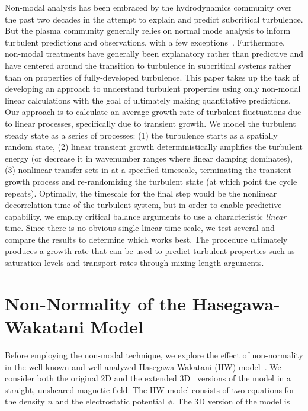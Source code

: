 \documentclass[letter,scriptaddress,twocolumn, prl,showkeys]{revtex4}
\begin{document}
Non-modal analysis has been embraced by the hydrodynamics community over the past two decades in the attempt to explain and predict subcritical turbulence. But the plasma community
generally relies on normal mode analysis to inform turbulent predictions and observations, with a few exceptions~\cite{camargo1998,camporeale2010,schekochihin2012}. 
Furthermore, non-modal treatments have generally been explanatory rather than predictive and have centered around the transition to turbulence in subcritical systems rather 
than on properties of fully-developed turbulence.
This paper takes up the task of developing an approach to understand turbulent properties using only non-modal linear calculations with the goal of 
ultimately making quantitative predictions.  Our approach is to calculate an average growth rate of turbulent fluctuations due to linear processes, specifically due to transient growth.  We model the
turbulent steady state as a series of processes:  (1) the turbulence starts as a spatially random state, (2) linear transient growth deterministically amplifies the turbulent energy (or
decrease it in wavenumber ranges where linear damping dominates), (3) nonlinear transfer sets in at a specified timescale, terminating the
transient growth process and re-randomizing the turbulent state (at which point the cycle repeats).    Optimally, the timescale for the final step would be the
nonlinear decorrelation time of the turbulent system, but in order to enable predictive capability, we employ critical balance
arguments to use a characteristic \emph{linear} time. Since there is no obvious single linear time scale, we test several and compare the results to determine which works best.
The procedure ultimately produces a growth rate that can be used
to predict turbulent properties such as saturation levels and transport rates through mixing length arguments.

\section{Non-Normality of the Hasegawa-Wakatani Model}

Before employing the non-modal technique, we explore the effect of non-normality in the well-known and well-analyzed Hasegawa-Wakatani (HW) model~\cite{hasegawa1983}. 
We consider both the original 2D and the extended 3D~\cite{biskamp1995} versions of the model in a straight, unsheared magnetic field. 
The HW model consists of two equations for the density $n$ and the electrostatic potential $\phi$. The 3D version of the model is
\end{document}
